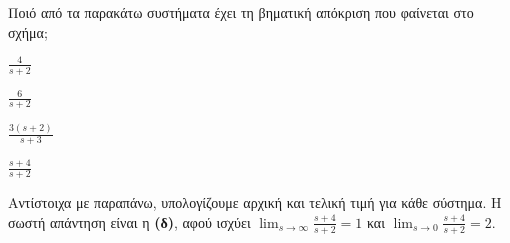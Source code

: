 \documentclass[11pt,a4paper,notitlepage,fleqn,final]{article}
\begin{document}
\begin{exercise}
Ποιό από τα παρακάτω συστήματα έχει τη βηματική απόκριση που φαίνεται στο σχήμα;


\begin{enumlatin}
	\item \( \displaystyle \frac{4}{s+2} \)
	\item \( \displaystyle \frac{6}{s+2} \)
	\item \( \displaystyle \frac{3(s+2)}{s+3} \)
	\item \( \displaystyle \frac{s+4}{s+2} \)
\end{enumlatin}

\tcblower

Αντίστοιχα με παραπάνω, υπολογίζουμε αρχική και τελική τιμή για κάθε σύστημα. Η σωστή απάντηση είναι η
\textbf{(δ)}, αφού ισχύει \( \lim_{s\to \infty} \frac{s+4}{s+2} = 1 \) και \( \lim_{s\to 0} \frac{s+4}{s+2} = 2 \).

\end{exercise}
\end{document}
